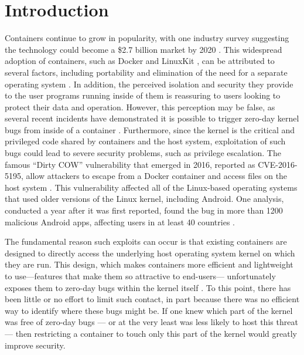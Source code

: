 \section{Introduction}
\label{sec.introduction}
Containers continue to grow in popularity, with one industry survey suggesting the technology could become a \$2.7 billion market by 2020 \cite{451-Research}. 
This widespread adoption of containers, such as Docker \cite{Docker} and LinuxKit \cite{LinuxKit}, can be attributed to several factors, 
including portability and elimination of the need for a separate operating system \cite{what-containers-do}. 
In addition, the perceived isolation and security they provide to the user programs running inside of them is reassuring to users looking to protect their data and operation. 
However, this perception may be false, as several recent incidents have demonstrated it is possible to trigger zero-day kernel bugs from inside of a container \cite{containers-kernel-bug-tcp, containers-runc-vulnerability}. 
Furthermore, since the kernel is the critical and privileged code shared by containers and the host system, exploitation of such bugs could lead to severe security problems, such as privilege escalation. 
The famous ``Dirty COW'' vulnerability that emerged in 2016, reported as CVE-2016-5195, allow attackers to escape from a Docker container and access files on the host system \cite{dirty-cow}. 
This vulnerability affected all of the Linux-based operating systems that used older versions of the Linux kernel, including Android. 
One analysis, conducted a year after it was first reported, found the bug in more than 1200 malicious Android apps, affecting users in at least 40 countries \cite{dirty-cow-impact}. 

The fundamental reason such exploits can occur is that existing containers are designed to directly access the underlying host operating system kernel on which they are run. 
This design, which makes containers more efficient and lightweight to use—features that make them so attractive to end-users— 
unfortunately exposes them to zero-day bugs within the kernel itself \cite{containers-kernel-bug-tcp}. 
To this point, there has been little or no effort to limit such contact, in part because there was no efficient way to identify where these bugs might be. 
If one knew which part of the kernel was free of zero-day bugs — or at the very least was less likely to host this threat— then restricting a container to touch only this part of the kernel would greatly improve security. 


